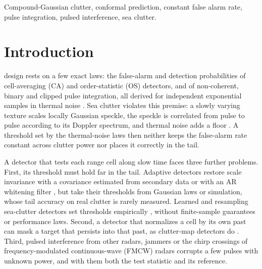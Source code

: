 \documentclass[journal]{IEEEtran}
\begin{document}
\begin{IEEEkeywords}
Compound-Gaussian clutter, conformal prediction, constant false alarm rate, pulse integration, pulsed interference, sea clutter.
\end{IEEEkeywords}

\section{Introduction}
 design rests on a few exact laws: the false-alarm and detection probabilities of cell-averaging (CA) and order-statistic (OS) detectors, and of non-coherent, binary and clipped pulse integration, all derived for independent exponential samples in thermal noise \cite{finn1968,rohling1983,gandhi1988,richards2014,abbasi2018clip}. Sea clutter violates this premise: a slowly varying texture scales locally Gaussian speckle, the speckle is correlated from pulse to pulse according to its Doppler spectrum, and thermal noise adds a floor \cite{ward2013,conte1995,ollila2012}. A threshold set by the thermal-noise laws then neither keeps the false-alarm rate constant across clutter power nor places it correctly in the tail.

A detector that tests each range cell along slow time faces three further problems. First, its threshold must hold far in the tail. Adaptive detectors restore scale invariance with a covariance estimated from secondary data \cite{kelly1986glrt,conte1995,kraut1999,pascal2008fp} or with an AR whitening filter \cite{roman2000,michels2000}, but take their thresholds from Gaussian laws or simulation, whose tail accuracy on real clutter is rarely measured. Learned and resampling sea-clutter detectors set thresholds empirically \cite{bai2026cvae,rouzoumka2026ood,qu2023sensors,qu2024sieve,qu2026sact}, without finite-sample guarantees or performance laws. Second, a detector that normalizes a cell by its own past can mask a target that persists into that past, as clutter-map detectors do \cite{lops1989,naldi1999}. Third, pulsed interference from other radars, jammers or the chirp crossings of frequency-modulated continuous-wave (FMCW) radars corrupts a few pulses with unknown power, and with them both the test statistic and its reference.
\end{document}
